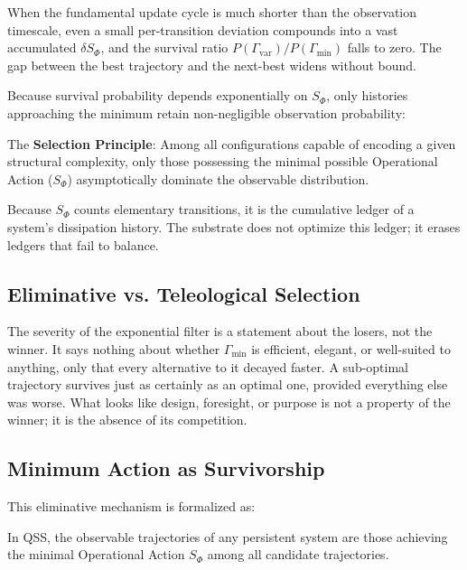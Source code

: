 When the fundamental update cycle is much shorter than the observation timescale, even a small per-transition deviation compounds into a vast accumulated $\delta S_\Phi$, and the survival ratio $P(\Gamma_{\text{var}})/P(\Gamma_{\text{min}})$ falls to zero. The gap between the best trajectory and the next-best widens without bound.

Because survival probability depends exponentially on $S_\Phi$, only histories approaching the minimum retain non-negligible observation probability:

\begin{samepage}
\begin{mdframed}[linewidth=1pt,linecolor=black,backgroundcolor=gray!10]
    \noindent The \textbf{Selection Principle}: Among all configurations capable of encoding a given structural complexity, only those possessing the minimal possible Operational Action ($S_\Phi$) asymptotically dominate the observable distribution.
\end{mdframed}
\end{samepage}

Because $S_\Phi$ counts elementary transitions, it is the cumulative ledger of a system's dissipation history. The substrate does not optimize this ledger; it erases ledgers that fail to balance.

\subsection{Eliminative vs. Teleological Selection}
\label{subsec:teleology}
The severity of the exponential filter is a statement about the losers, not the winner. It says nothing about whether $\Gamma_{\text{min}}$ is efficient, elegant, or well-suited to anything, only that every alternative to it decayed faster. A sub-optimal trajectory survives just as certainly as an optimal one, provided everything else was worse. What looks like design, foresight, or purpose is not a property of the winner; it is the absence of its competition.

\subsection{Minimum Action as Survivorship}
\label{subsec:minimum_action_as_survivorship}
This eliminative mechanism is formalized as:

\begin{proposition}
In QSS, the observable trajectories of any persistent system are those achieving the minimal Operational Action $S_\Phi$ among all candidate trajectories.
\end{proposition}

